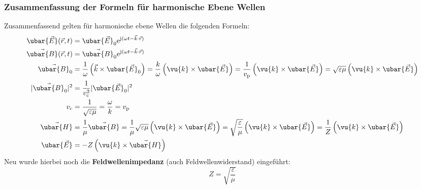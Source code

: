 \subsubsection{Zusammenfassung der Formeln für harmonische Ebene Wellen}
 Zusammenfassend gelten für harmonische ebene Wellen die folgenden Formeln:
 \begin{equation}\label{ebwellzsfg}\begin{split}
 		\ubar{\vec{E}}(\vec{r} , t) & =\ubar{\vec{E}}_0 \mathrm{e}^{\mathrm{j}(\omega t - \vec{k}\cdot\vec{r} )} \\
 		\vec{\ubar{B}}(\vec{r} , t)  &=\vec{\ubar{B}}_0 \mathrm{e}^{\mathrm{j}(\omega t - \vec{k}\cdot\vec{r} )}  \\
 		 \vec{\ubar{B}}_0 &= \frac{1}{\omega} \left(\vec{k} \times \ubar{\vec{E}}_0\right)= \frac{ k}{\omega} \left(\vu{k} \times \ubar{\vec{E}}\right) = \frac{1}{ v_\mathrm{p}} \left(\vu{k} \times \ubar{\vec{E}}\right) = \sqrt{\varepsilon\mu} \left(\vu{k} \times \ubar{\vec{E}}\right) \\
 		 |\vec{\ubar{B}}_0|^2 &= \frac{1}{ v_\mathrm{c}^2} |\ubar{\vec{E}}_0|^2 \\
 		v_\mathrm{c} &= \frac{1}{\sqrt{\varepsilon\mu}} = \frac{\omega}{ k} = v_\mathrm{p}\\
 			\vec{\ubar{H}} &= \frac{1}{\mu}\vec{\ubar{B}} = \frac{1}{\mu}\sqrt{\varepsilon\mu} \left(\vu{k} \times \ubar{\vec{E}}\right) = \sqrt{\frac{\varepsilon}{\mu}} \left(\vu{k} \times \ubar{\vec{E}}\right) = \frac{1}{Z} \left(\vu{k} \times \ubar{\vec{E}}\right)\\
	\ubar{\vec{E}} &= -Z \left(\vu{k} \times \vec{\ubar{H}}\right)
 \end{split}\end{equation}
Neu wurde hierbei noch die \textbf{Feldwellenimpedanz} (auch Feldwellenwiderstand) eingeführt:
\begin{equation}\label{feldwellenwid}
	\boxed{Z=\sqrt{\frac{\varepsilon}{\mu}}}
\end{equation}
